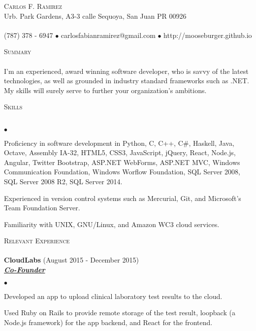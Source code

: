 \documentclass{article}
\newcommand{\lineunder}{\vspace*{-8pt} \\ \hspace*{-18pt} \hrulefill \\}
\newcommand{\header}[1]{{\hspace*{-15pt}\vspace*{6pt} \textsc{#1}} \vspace*{-6pt} \lineunder}
\newcommand{\employer}[3]{{ \textbf{#1} (#2)\\ \underline{\textbf{\emph{#3}}}\\  }}
\newcommand{\contact}[3]{
\vspace*{-8pt}
\begin{center}
{\LARGE \scshape {#1}}\\
#2 \lineunder 
#3
\end{center}
\vspace*{-8pt}
}
\newenvironment{achievements}{\begin{list}{$\bullet$}{\topsep 0pt \itemsep -2pt}}{\vspace*{4pt}\end{list}}
\begin{document}
\small
\smallskip
\vspace*{-44pt}

\contact{Carlos F. Ramirez}
{Urb. Park Gardens, A3-3 calle Sequoya, San Juan PR 00926}
{(787) 378 - 6947 $\bullet$ carlosfabianramirez@gmail.com $\bullet$ http://mooseburger.github.io}

\header{Summary}
I'm an experienced, award winning software developer, who is savvy of the latest technologies, as well as grounded in industry standard frameworks such as .NET. My skills will surely serve to further your organization's ambitions.  

\header{Skills}
\begin{achievements}
\item Proficiency in software development in Python, C, C++, C\string#, Haskell, Java, Octave, Assembly IA-32, HTML5, CSS3, JavaScript, jQuery, React, Node.js, Angular, Twitter Bootstrap, ASP.NET WebForms, ASP.NET MVC, Windows Communication Foundation, Windows Worflow Foundation, SQL Server 2008, SQL Server 2008 R2, SQL Server 2014.
\item Experienced in version control systems such as Mercurial, Git, and Microsoft's Team Foundation Server.
\item Familiarity with UNIX, GNU/Linux, and Amazon WC3 cloud services.
\end{achievements}

\header{Relevant Experience}

\employer{CloudLabs}{August 2015 - December 2015}{Co-Founder}
	\begin{achievements}
	\item Developed an app to upload clinical laboratory test results to the cloud.
	\item Used Ruby on Rails to provide remote storage of the test result, loopback (a Node.js framework) for the app backend, and React for the frontend.
	\end{achievements}
\end{document}
